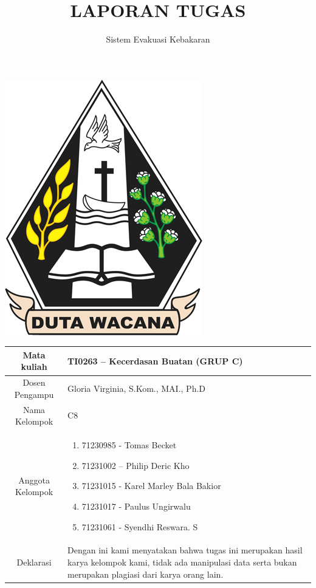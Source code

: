 \documentclass{article}
\title{\textbf{LAPORAN TUGAS}}
\author{Sistem Evakuasi Kebakaran}
\date{}
\begin{document}
\maketitle
\begin{center}
    \includegraphics[scale=0.4]{logo-ukdw.png}
\end{center}

\begin{table}[h]
    \centering
    \renewcommand{\arraystretch}{1.5}
    \begin{tabularx}{\textwidth}{|c|X|}
        \hline
        Mata kuliah	& TI0263 – Kecerdasan Buatan (GRUP C) \\
        \hline
        Dosen Pengampu & Gloria Virginia, S.Kom., MAI., Ph.D \\
        \hline
        Nama Kelompok & C8 \\
        \hline 
        Anggota Kelompok & 
        \begin{minipage}{\textwidth}
            \vspace{5px}
            \begin{enumerate}
                \item 71230985 - Tomas Becket
                \item 71231002 – Philip Deric Kho  
                \item 71231015 - Karel Marley Bala Bakior
                \item 71231017 - Paulus Ungirwalu
                \item 71231061 - Syendhi Reswara. S
            \end{enumerate}
            \vspace{5px}
        \end{minipage} \\
        \hline
        Deklarasi & Dengan ini kami menyatakan bahwa tugas ini merupakan hasil karya kelompok kami, tidak ada manipulasi data serta bukan merupakan plagiasi dari karya orang lain. \\
        \hline
    \end{tabularx}
\end{table}
\end{document}
